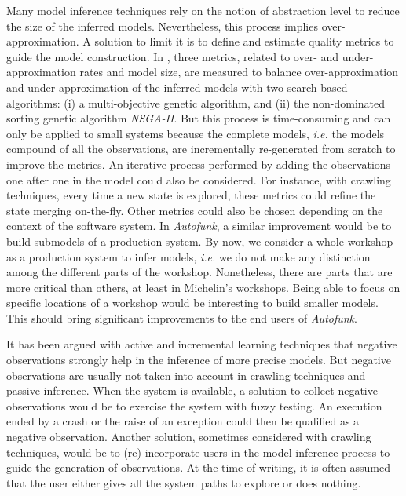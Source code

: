 Many model inference techniques rely on the notion of abstraction
level to reduce the size of the inferred models. Nevertheless,
this process implies over-approximation. A solution to limit it
is to define and estimate quality metrics
\cite{tonella2012finding,Lo20122063} to guide the model
construction. In \cite{tonella2012finding}, three metrics,
related to over- and under-approximation rates and model size,
are measured to balance over-approximation and
under-approximation of the inferred models with two search-based
algorithms: (i) a multi-objective genetic algorithm, and (ii) the
non-dominated sorting genetic algorithm \textit{NSGA-II}. But
this process is time-consuming and can only be applied to small
systems because the complete models, \emph{i.e.} the models compound of
all the observations, are incrementally re-generated from scratch
to improve the metrics.  An iterative process performed by adding
the observations one after one in the model could also be
considered. For instance, with crawling techniques, every time a
new state is explored, these metrics could refine the state
merging on-the-fly. Other metrics could also be chosen depending
on the context of the software system. In \textit{Autofunk}, a
similar improvement would be to build submodels of a production
system. By now, we consider a whole workshop as a production
system to infer models, \emph{i.e.} we do not make any distinction among
the different parts of the workshop. Nonetheless, there are parts
that are more critical than others, at least in Michelin's
workshops. Being able to focus on specific locations of a
workshop would be interesting to build smaller models. This
should bring significant improvements to the end users of
\textit{Autofunk}.

It has been argued with active and incremental learning
techniques that negative observations strongly help in the
inference of more precise models. But negative observations are
usually not taken into account in crawling techniques and passive
inference. When the system is available, a solution to collect
negative observations would be to exercise the system with fuzzy
testing. An execution ended by a crash or the raise of an
exception could then be qualified as a negative observation.
Another solution, sometimes considered with crawling techniques,
would be to (re) incorporate users in the model inference process
to guide the generation of observations. At the time of writing,
it is often assumed that the user either gives all the system
paths to explore or does nothing.

